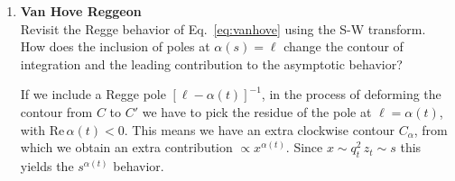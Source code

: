 \begin{enumerate}
    \item \textbf{Van Hove Reggeon} \\
          Revisit the Regge behavior of Eq.~\ref{eq:vanhove} using the S-W transform. How does the inclusion of poles at $\alpha(s) = \ell$ change the contour of integration and the leading contribution to the asymptotic behavior?

          \begin{solution}
              If we include a Regge pole $[\ell-\alpha(t)]^{-1}$, in the process of deforming the contour from $C$ to $C'$ we have to pick the residue of the pole at $\ell=\alpha(t)$, with $\textrm{Re}\,\alpha(t)<0$. This means we have an extra clockwise contour $C_\alpha$, from which we obtain an extra contribution $\propto x^{\alpha(t)}$. Since $x \sim q_t^2 \, z_t \sim s$ this yields the $s^{\alpha(t)}$ behavior.
          \end{solution}

\end{enumerate}